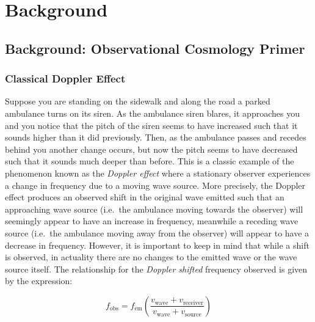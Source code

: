 \chapter{Background}

\section{Background: Observational Cosmology
Primer}\label{background-observational-cosmology-primer}

\subsection{Classical Doppler Effect}\label{classical-doppler-effect}

Suppose you are standing on the sidewalk and along the road a parked
ambulance turns on its siren. As the ambulance siren blares, it
approaches you and you notice that the pitch of the siren seems to have
increased such that it sounds higher than it did previously. Then, as
the ambulance passes and recedes behind you another change occurs, but
now the pitch seems to have decreased such that it sounds much deeper
than before. This is a classic example of the phenomenon known as the
\emph{Doppler effect} where a stationary observer experiences a change
in frequency due to a moving wave source. More precisely, the Doppler
effect produces an observed shift in the original wave emitted such that
an approaching wave source (i.e.~the ambulance moving towards the
observer) will seemingly appear to have an increase in frequency,
meanwhile a receding wave source (i.e.~the ambulance moving away from
the observer) will appear to have a decrease in frequency. However, it
is important to keep in mind that while a shift is observed, in
actuality there are no changes to the emitted wave or the wave source
itself. The relationship for the \emph{Doppler shifted} frequency
observed is given by the expression:

\begin{equation}f_\text{obs} = f_\text{em} \left (\frac{v_\text{wave} + v_\text{receiver}}{v_\text{wave} + v_\text{source}}  \right )\label{eq:classicdop}\end{equation}

